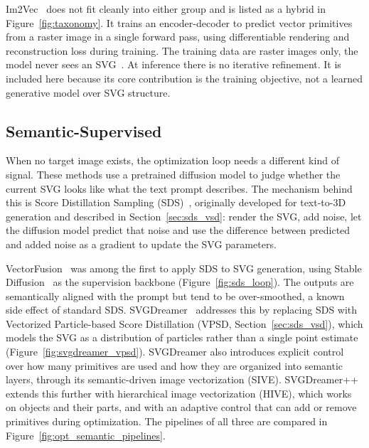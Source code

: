Im2Vec~\cite{reddyIm2VecSynthesizingVector2021} does not fit cleanly into either group and is listed as a hybrid in Figure~\ref{fig:taxonomy}. 
It trains an encoder-decoder to predict vector primitives from a raster image in a single forward pass, 
using differentiable rendering and reconstruction loss during training. The training data are raster images only, 
the model never sees an SVG~\cite{reddyIm2VecSynthesizingVector2021}. At inference there is no iterative refinement. 
It is included here because its core contribution is the training objective, not a learned generative model over SVG structure.

\subsection{Semantic-Supervised}

When no target image exists, the optimization loop needs a different 
kind of signal. These methods use a pretrained diffusion model to judge whether the 
current SVG looks like what the text prompt describes. The mechanism 
behind this is Score Distillation Sampling 
(SDS)~\cite{pooleDreamFusionTextto3DUsing2022}, originally developed 
for text-to-3D generation and described in 
Section~\ref{sec:sds_vsd}: render the SVG, add noise, let the 
diffusion model predict that noise and 
use the difference between predicted and added noise as a gradient to update the SVG parameters.

VectorFusion~\cite{jainVectorFusionTexttoSVGAbstracting2022} was 
among the first to apply SDS to SVG generation, using Stable 
Diffusion~\cite{rombachHighResolutionImageSynthesis2021} as the 
supervision backbone (Figure~\ref{fig:sds_loop}). The outputs are 
semantically aligned with the prompt but tend to be over-smoothed, 
a known side effect of standard SDS. 
SVGDreamer~\cite{xingSVGDreamerTextGuided2024} addresses this by 
replacing SDS with Vectorized Particle-based Score Distillation 
(VPSD, Section~\ref{sec:sds_vsd}), which models the SVG as a 
distribution of particles rather than a single point estimate 
(Figure~\ref{fig:svgdreamer_vpsd}). SVGDreamer also introduces 
explicit control over how many primitives are used and how they 
are organized into semantic layers, through its semantic-driven 
image vectorization (SIVE). 
SVGDreamer++~\cite{xingSVGDreamerAdvancingEditability2025} extends 
this further with hierarchical image vectorization (HIVE), which works 
on objects and their parts, and with an adaptive control that can add 
or remove primitives during optimization. The pipelines of all three 
are compared in Figure~\ref{fig:opt_semantic_pipelines}.


